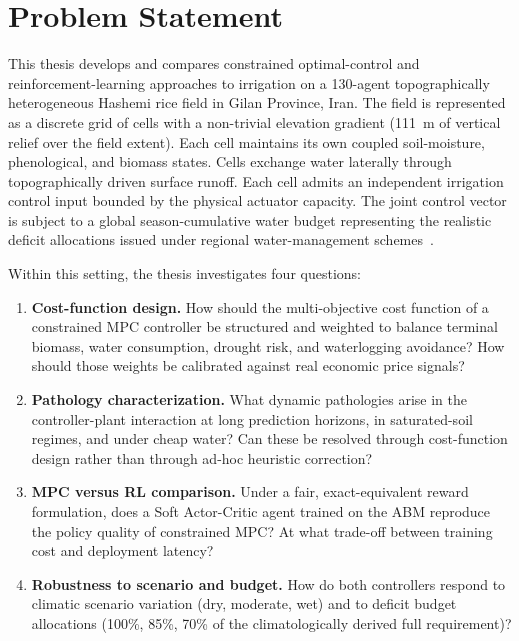 \section{Problem Statement}
\label{sec:intro-problem}

This thesis develops and compares constrained optimal-control and
reinforcement-learning approaches to irrigation on a 130-agent
topographically heterogeneous Hashemi rice field in Gilan Province,
Iran. The field is represented as a discrete grid of cells with a
non-trivial elevation gradient (111~m of vertical relief over the
field extent). Each cell maintains its own coupled soil-moisture,
phenological, and biomass states. Cells exchange water laterally
through topographically driven surface runoff. Each cell admits an
independent irrigation control input bounded by the physical actuator
capacity. The joint control vector is subject to a global
season-cumulative water budget representing the realistic deficit
allocations issued under regional water-management
schemes~\cite{Mesgaran2018,Nouri2023}.

Within this setting, the thesis investigates four questions:

\begin{enumerate}
\item \textbf{Cost-function design.} How should the multi-objective
cost function of a constrained MPC controller be structured and
weighted to balance terminal biomass, water consumption, drought
risk, and waterlogging avoidance? How should those weights be
calibrated against real economic price signals?

\item \textbf{Pathology characterization.} What dynamic pathologies
arise in the controller-plant interaction at long prediction
horizons, in saturated-soil regimes, and under cheap water? Can
these be resolved through cost-function design rather than through
ad-hoc heuristic correction?

\item \textbf{MPC versus RL comparison.} Under a fair, exact-equivalent
reward formulation, does a Soft Actor-Critic agent trained on the
ABM reproduce the policy quality of constrained MPC? At what
trade-off between training cost and deployment latency?

\item \textbf{Robustness to scenario and budget.} How do both
controllers respond to climatic scenario variation (dry, moderate,
wet) and to deficit budget allocations (100\%, 85\%, 70\% of the
climatologically derived full requirement)?
\end{enumerate}

